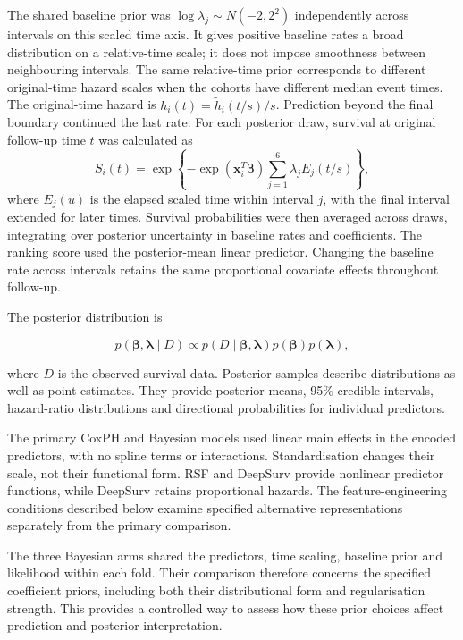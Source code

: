 The shared baseline prior was $\log\lambda_j\sim N(-2,2^2)$ independently across intervals on this scaled time axis. It gives positive baseline rates a broad distribution on a relative-time scale; it does not impose smoothness between neighbouring intervals. The same relative-time prior corresponds to different original-time hazard scales when the cohorts have different median event times. The original-time hazard is $h_i(t)=\widetilde h_i(t/s)/s$. Prediction beyond the final boundary continued the last rate. For each posterior draw, survival at original follow-up time $t$ was calculated as
\begin{equation}
S_i(t)=\exp\left\{-\exp(\mathbf{x}_i^T\boldsymbol\beta)\sum_{j=1}^{6}\lambda_j E_j(t/s)\right\},
\end{equation}
where $E_j(u)$ is the elapsed scaled time within interval $j$, with the final interval extended for later times. Survival probabilities were then averaged across draws, integrating over posterior uncertainty in baseline rates and coefficients. The ranking score used the posterior-mean linear predictor. Changing the baseline rate across intervals retains the same proportional covariate effects throughout follow-up.

The posterior distribution is

    \begin{equation}
    p\left( \mathbf{\beta},\mathbf{\lambda} \mid D \right) \propto p\left( D \mid \mathbf{\beta},\mathbf{\lambda} \right)p\left( \mathbf{\beta} \right)p\left( \mathbf{\lambda} \right),
\end{equation}


where \(D\) is the observed survival data. Posterior samples describe distributions as well as point estimates. They provide posterior means, 95\% credible intervals, hazard-ratio distributions and directional probabilities for individual predictors.

The primary CoxPH and Bayesian models used linear main effects in the encoded predictors, with no spline terms or interactions. Standardisation changes their scale, not their functional form. RSF and DeepSurv provide nonlinear predictor functions, while DeepSurv retains proportional hazards. The feature-engineering conditions described below examine specified alternative representations separately from the primary comparison.

The three Bayesian arms shared the predictors, time scaling, baseline prior and likelihood within each fold. Their comparison therefore concerns the specified coefficient priors, including both their distributional form and regularisation strength. This provides a controlled way to assess how these prior choices affect prediction and posterior interpretation.


